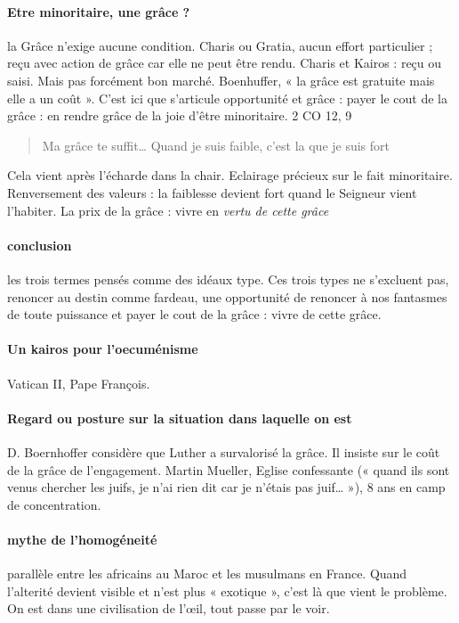 \paragraph{Etre minoritaire, une grâce ?} la Grâce n’exige aucune condition. Charis ou Gratia, aucun effort particulier ; reçu avec action de grâce car elle ne peut être rendu. Charis et Kairos : reçu ou saisi.
Mais pas forcément bon marché. Boenhuffer, « la grâce est gratuite mais elle a un coût ». C’est ici que s’articule opportunité et grâce : payer le cout de la grâce : en rendre grâce de la joie d’être minoritaire.
2 CO 12, 9
\begin{quote}
Ma grâce te suffit…
Quand je suis faible, c’est la que je suis fort
\end{quote} 
Cela vient après l’écharde dans la chair. Eclairage précieux sur le fait minoritaire. Renversement des valeurs : la faiblesse devient fort quand le Seigneur vient l’habiter. La prix de la grâce : vivre en \textit{ vertu de cette grâce }

\paragraph{conclusion} les trois termes pensés comme des idéaux type. Ces trois types ne s’excluent pas, renoncer au destin comme fardeau,  une opportunité de renoncer à nos fantasmes de toute puissance et payer le cout de la grâce : vivre de cette grâce.

\paragraph{Un kairos pour l’oecuménisme} Vatican II, Pape François. 

\paragraph{Regard ou posture sur la situation dans laquelle on est} D. Boernhoffer considère que Luther a survalorisé la grâce. Il insiste sur le coût de la grâce de l’engagement.  Martin Mueller, Eglise confessante (« quand ils sont venus chercher les juifs, je n’ai rien dit car je n’étais pas juif… »), 8 ans en camp de concentration. 

\paragraph{mythe de l’homogéneité} parallèle entre les africains au Maroc et les musulmans en France. Quand l’alterité devient visible et n’est plus « exotique », c’est là que vient le problème. On est dans une civilisation de l’œil, tout passe par le voir. 


